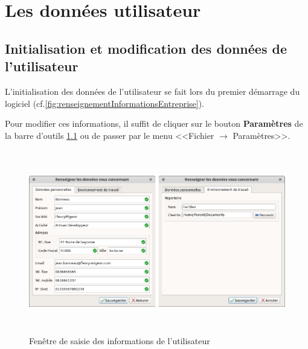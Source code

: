 \chapter{Les données utilisateur}
\section{Initialisation et modification des données de l'utilisateur}
L'initialisation des données de l'utilisateur se fait lors du premier démarrage du logiciel (cf.\ref{fig:renseignementInformationsEntreprise}).

Pour modifier ces informations, il suffit de cliquer sur le bouton \textbf{Paramètres} de la barre d'outils \ref{fig:modifierUtilisateur} ou de passer par le menu <<Fichier $\rightarrow$ Paramètres>>. 

\begin{figure}[H]
	\centering
	\includegraphics[height=8cm]{screens/modifierUtilisateur.png}
	\caption{Fenêtre de saisie des informations de l'utilisateur}
	\label{fig:modifierUtilisateur}
\end{figure}